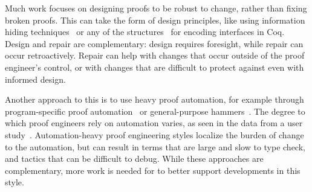 
Much work focuses on designing proofs
to be robust to change, rather than fixing broken proofs.
This can take the form of design principles, like using 
information hiding techniques~\cite{Woos:2016:PCF:2854065.2854081, Klein:2014:CFV:2584468.2560537}
or any of the structures~\cite{Chrzaszcz2003, Sozeau2008, Saibi:PhD} for encoding interfaces in Coq.
Design and repair are complementary: design requires foresight, while repair can occur retroactively.
Repair can help with changes that occur outside of the proof engineer's control,
or with changes that are difficult to protect against even with informed design.

Another approach to this is to use heavy proof automation, for example through
program-specific proof automation~\cite{Chlipala:2013:CPD:2584504}
or general-purpose hammers~\cite{Blanchette2016b, Blanchette2013, Kaliszyk2014, Czajka2018}.
The degree to which proof engineers rely on automation varies, as seen in the data from a user study~\cite{replica}.
Automation-heavy proof engineering styles localize the burden of change to the automation,
but can result in terms that are large and slow to type check,
and tactics that can be difficult to debug.
While these approaches are complementary, more work is needed for \toolname to better support 
developments in this style.



